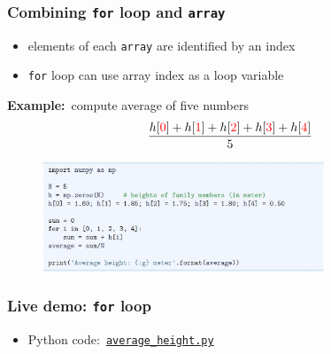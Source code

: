 \documentclass[english,14pt]{beamer}
\newcommand\red[1]{{\color{red} #1}}
\begin{document}
\begin{frame}[fragile]

\frametitle{Combining \texttt{for} loop and \texttt{array}}

\begin{itemize}
	\item elements of each \texttt{array} are identified by an index
	\item \texttt{for} loop can use array index as a loop variable
\end{itemize}
\vspace*{2mm}
\textbf{Example:}~compute average of five numbers
\[
\frac{h[\red{0}] + h[\red{1}] + h[\red{2}] + h[\red{3}] + h[\red{4}]}{5}
\]
\vspace*{-6mm}
\begin{figure}[ht]
	\centering
	\includegraphics[width=0.75\textwidth]{figures/LLp62a}
\end{figure}

\end{frame}


\begin{frame}[fragile]

\frametitle{Live demo: \texttt{for} loop}

\begin{itemize}
	\item Python code:~\href{https://github.com/slgit/prog4comp_2/blob/master/py36-src/average_height.py}{\texttt{average\_height.py}}
\end{itemize}

\end{frame}

\end{document}
